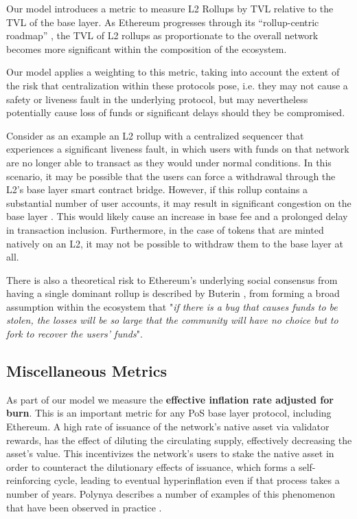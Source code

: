\documentclass[conference]{IEEEtran}
\begin{document}
Our model introduces a metric to measure L2 Rollups by TVL relative to the TVL of the base layer.  As Ethereum progresses through its ``rollup-centric roadmap'' \cite{buterin2020}, the TVL of L2 rollups as proportionate to the overall network becomes more significant within the composition of the ecosystem.

Our model applies a weighting to this metric, taking into account the extent of the risk that centralization within these protocols pose, i.e. they may not cause a safety or liveness fault in the underlying protocol, but may nevertheless potentially cause loss of funds or significant delays should they be compromised.

Consider as an example an L2 rollup with a centralized sequencer that experiences a significant liveness fault, in which users with funds on that network are no longer able to transact as they would under normal conditions.  In this scenario, it may be possible that the users can force a withdrawal through the L2's base layer smart contract bridge.  However, if this rollup contains a substantial number of user accounts, it may result in significant congestion on the base layer \cite{gorzny2022ideal}.  This would likely cause an increase in base fee and a prolonged delay in transaction inclusion.  Furthermore, in the case of tokens that are minted natively on an L2, it may not be possible to withdraw them to the base layer at all.

There is also a theoretical risk to Ethereum's underlying social consensus from having a single dominant rollup is described by Buterin \cite{buterin2023}, from forming a broad assumption within the ecosystem that "\textit{if there is a bug that causes funds to be stolen, the losses will be so large that the community will have no choice but to fork to recover the users' funds}".

\subsection{Miscellaneous Metrics}

As part of our model we measure the \textbf{effective inflation rate adjusted for burn}.  This is an important metric for any PoS base layer protocol, including Ethereum.  A high rate of issuance of the network's native asset via validator rewards, has the effect of diluting the circulating supply, effectively decreasing the asset's value.  This incentivizes the network's users to stake the native asset in order to counteract the dilutionary effects of issuance, which forms a self-reinforcing cycle, leading to eventual hyperinflation even if that process takes a number of years.  Polynya describes a number of examples of this phenomenon that have been observed in practice \cite{polynya2022}. 
\end{document}
